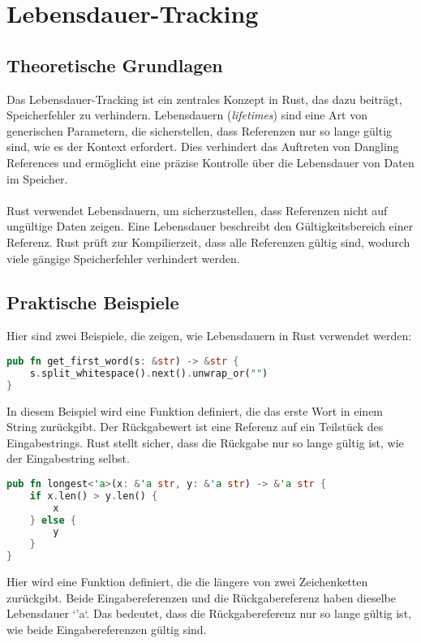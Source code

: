 \chapter{Lebensdauer-Tracking}

\section{Theoretische Grundlagen}
Das Lebensdauer-Tracking ist ein zentrales Konzept in Rust, das dazu beiträgt, Speicherfehler zu verhindern. 
Lebensdauern (\emph{lifetimes}) sind eine Art von generischen Parametern, die sicherstellen, dass Referenzen nur so lange gültig sind, wie es der Kontext erfordert. 
Dies verhindert das Auftreten von Dangling References und ermöglicht eine präzise Kontrolle über die Lebensdauer von Daten im Speicher.\\
\\
Rust verwendet Lebensdauern, um sicherzustellen, dass Referenzen nicht auf ungültige Daten zeigen. Eine Lebensdauer beschreibt den Gültigkeitsbereich einer Referenz. 
Rust prüft zur Kompilierzeit, dass alle Referenzen gültig sind, wodurch viele gängige Speicherfehler verhindert werden.

\section{Praktische Beispiele}
Hier sind zwei Beispiele, die zeigen, wie Lebensdauern in Rust verwendet werden:

\begin{lstlisting}[language=Rust, caption={Ermitteln des ersten Wortes}]
pub fn get_first_word(s: &str) -> &str {
    s.split_whitespace().next().unwrap_or("")
}
\end{lstlisting}
\noindent
In diesem Beispiel wird eine Funktion definiert, die das erste Wort in einem String zurückgibt. 
Der Rückgabewert ist eine Referenz auf ein Teilstück des Eingabestrings. Rust stellt sicher, dass die Rückgabe nur so lange gültig ist, wie der Eingabestring selbst.

\begin{lstlisting}[language=Rust, caption={Längere von zwei Zeichenketten ermitteln}]
pub fn longest<'a>(x: &'a str, y: &'a str) -> &'a str {
    if x.len() > y.len() {
        x
    } else {
        y
    }
}
\end{lstlisting}
\noindent
Hier wird eine Funktion definiert, die die längere von zwei Zeichenketten zurückgibt. 
Beide Eingabereferenzen und die Rückgabereferenz haben dieselbe Lebensdauer `'a`. Das bedeutet, dass die Rückgabereferenz nur so lange gültig ist, wie beide Eingabereferenzen gültig sind.


